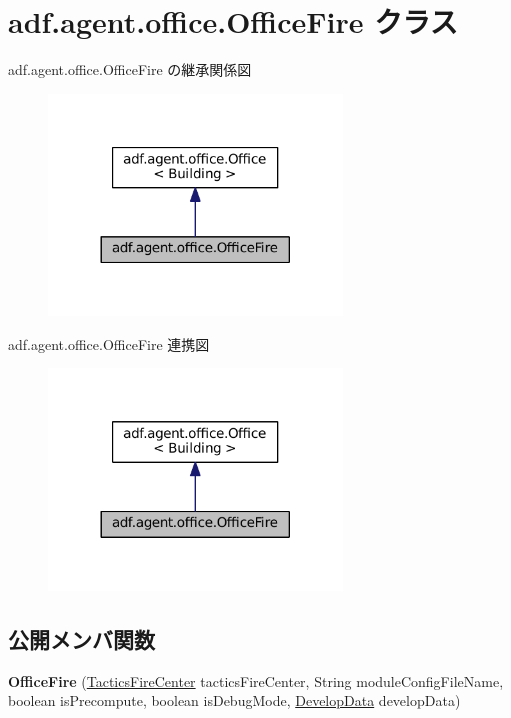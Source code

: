 \hypertarget{classadf_1_1agent_1_1office_1_1OfficeFire}{}\section{adf.\+agent.\+office.\+Office\+Fire クラス}
\label{classadf_1_1agent_1_1office_1_1OfficeFire}


adf.\+agent.\+office.\+Office\+Fire の継承関係図
\nopagebreak
\begin{figure}[H]
\begin{center}
\leavevmode
\includegraphics[width=221pt]{classadf_1_1agent_1_1office_1_1OfficeFire__inherit__graph}
\end{center}
\end{figure}


adf.\+agent.\+office.\+Office\+Fire 連携図
\nopagebreak
\begin{figure}[H]
\begin{center}
\leavevmode
\includegraphics[width=221pt]{classadf_1_1agent_1_1office_1_1OfficeFire__coll__graph}
\end{center}
\end{figure}
\subsection*{公開メンバ関数}
\begin{DoxyCompactItemize}
\item 
\hypertarget{classadf_1_1agent_1_1office_1_1OfficeFire_acf46d15f2903f3c9d23834b6d8d85a73}{}\label{classadf_1_1agent_1_1office_1_1OfficeFire_acf46d15f2903f3c9d23834b6d8d85a73} 
{\bfseries Office\+Fire} (\hyperlink{classadf_1_1component_1_1tactics_1_1center_1_1TacticsFireCenter}{Tactics\+Fire\+Center} tactics\+Fire\+Center, String module\+Config\+File\+Name, boolean is\+Precompute, boolean is\+Debug\+Mode, \hyperlink{classadf_1_1agent_1_1develop_1_1DevelopData}{Develop\+Data} develop\+Data)
\end{DoxyCompactItemize}
